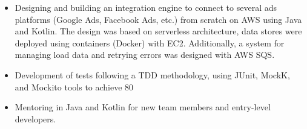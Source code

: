 \documentclass[letterpaper]{twentysecondcv} %
\begin{document}
\begin{twenty}
{        \begin{itemize}
            \item Designing and building an integration engine to connect to several ads platforms (Google Ads, Facebook Ads, etc.) from scratch on AWS using Java and Kotlin. The design was based on serverless architecture, data stores were deployed using containers (Docker) with EC2. Additionally, a system for managing load data and retrying errors was designed with AWS SQS.
         \end{itemize}

        \begin{itemize}
            \item Development of tests following a TDD methodology, using JUnit, MockK, and Mockito tools to achieve 80%
        \end{itemize}

        \begin{itemize}
            \item Mentoring in Java and Kotlin for new team members and entry-level developers.
        \end{itemize}
    }
    \\

\end{twenty}
\end{document}
